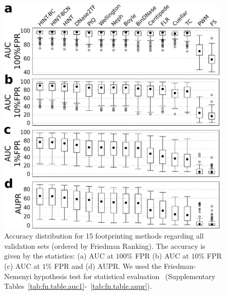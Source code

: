 \documentclass[11pt]{article}
\begin{document}
\clearpage

\begin{figure}[h!]
\centering
\includegraphics[width=0.99\textwidth]{Figs/Fig8.pdf}
\caption{Accuracy distribution for 15 footprinting methods regarding all validation sets (ordered by Friedman Ranking). The accuracy is given by the statistics: (a) AUC at $100\%$ FPR (b) AUC at $10\%$ FPR (c) AUC at $1\%$ FPR and (d) AUPR. We used the Friedman-Nemenyi hypothesis test for statistical evaluation~\citep{demsar2006} (Supplementary Tables~\ref{tab:fn.table.auc1}-~\ref{tab:fn.table.aupr}).}
\label{fig:auc_boxplot}
\end{figure}

\clearpage
\end{document}
